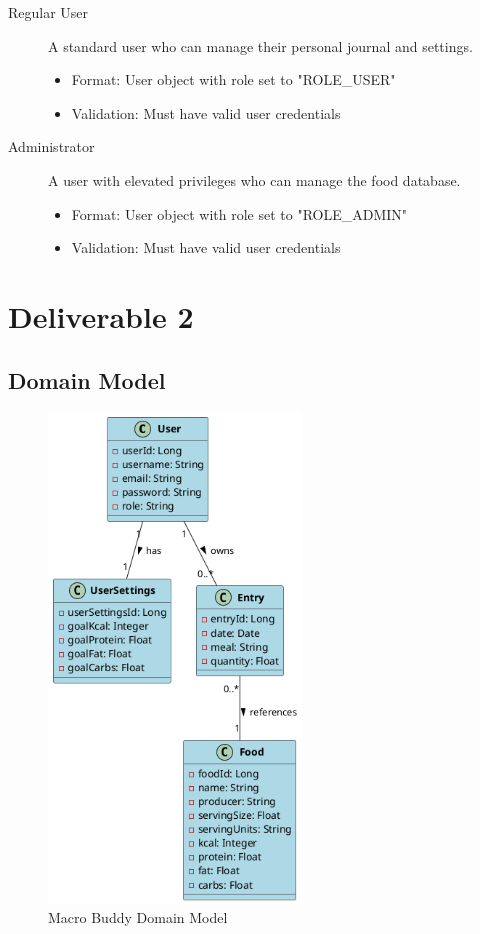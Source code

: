 \documentclass[a4paper,10pt]{article}
\begin{document}
\begin{description}
    \item[Regular User] A standard user who can manage their personal journal and settings.
        \begin{itemize}
            \item Format: User object with role set to "ROLE\_USER"
            \item Validation: Must have valid user credentials
        \end{itemize}

    \item[Administrator] A user with elevated privileges who can manage the food database.
        \begin{itemize}
            \item Format: User object with role set to "ROLE\_ADMIN"
            \item Validation: Must have valid user credentials
        \end{itemize}
    \end{description}

\newpage
\section{Deliverable 2}
    \subsection{Domain Model}
        \begin{figure}[h]
        \centering
        \includegraphics[width=0.6\textwidth]{domain_model.png}
        \caption{Macro Buddy Domain Model}
        \end{figure}
\end{document}
